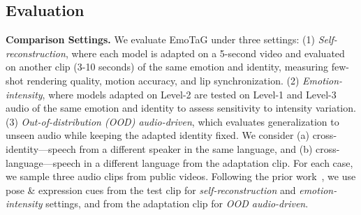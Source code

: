 \subsection{Evaluation}
\textbf{Comparison Settings.} 
We evaluate EmoTaG under three settings: (1) \textit{Self-reconstruction}, where each model is adapted on a 5-second video and evaluated on another clip (3-10 seconds) of the same emotion and identity, measuring few-shot rendering quality, motion accuracy, and lip synchronization.
(2) \textit{Emotion-intensity}, where models adapted on Level-2 are tested on Level-1 and Level-3 audio of the same emotion and identity to assess sensitivity to intensity variation.
(3) \textit{Out-of-distribution (OOD) audio-driven}, which evaluates generalization to unseen audio while keeping the adapted identity fixed. We consider (a) cross-identity—speech from a different speaker in the same language, and (b) cross-language—speech in a different language from the adaptation clip. For each case, we sample three audio clips from public videos.
Following the prior work~\cite{li2025instag}, we use pose \& expression cues from the test clip for \textit{self-reconstruction} and \textit{emotion-intensity} settings, and from the adaptation clip for \textit{OOD audio-driven}.


\begin{table}[t]
\centering
\small
{}
\vspace{-5pt}
\caption{
\textbf{Quantitative results of lip synchronization on \textit{OOD audio-driven}.} 
We evaluate two challenging scenarios: \textit{cross-identity} and \textit{cross-language}. 
[Key: \textbf{Best}, \underline{Second Best}]}
\vspace{-10pt}
\label{tab:cross_domain}
\end{table}

